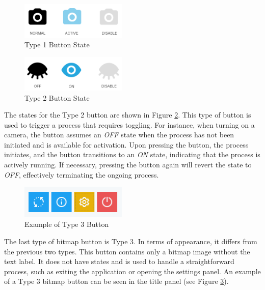 \begin{figure}[!ht]
    \centering
    \includegraphics[width=0.45\textwidth]{texs/Part2/chapter4/image/type1state.png}
    \caption{Type 1 Button State}
    \label{fig:type1_state}
\end{figure}

\begin{figure}[!ht]
    \centering
    \includegraphics[width=0.45\textwidth]{texs/Part2/chapter4/image/type2state.png}
    \caption{Type 2 Button State}
    \label{fig:type2_state}
\end{figure}

The states for the Type 2 button are shown in Figure \ref{fig:type2_state}. This type of button is used to trigger a process that requires toggling. For instance, when turning on a camera, the button assumes an \textit{OFF} state when the process has not been initiated and is available for activation. Upon pressing the button, the process initiates, and the button transitions to an \textit{ON} state, indicating that the process is actively running. If necessary, pressing the button again will revert the state to \textit{OFF}, effectively terminating the ongoing process.

\begin{figure}[!ht]
    \centering
    \includegraphics[width=0.45\textwidth]{texs/Part2/chapter4/image/type3state.png}
    \caption{Example of Type 3 Button}
    \label{fig:type3_state}
\end{figure}

The last type of bitmap button is Type 3. In terms of appearance, it differs from the previous two types. This button contains only a bitmap image without the text label. It does not have states and is used to handle a straightforward process, such as exiting the application or opening the settings panel. An example of a Type 3 bitmap button can be seen in the title panel (see Figure \ref{fig:type3_state}).

